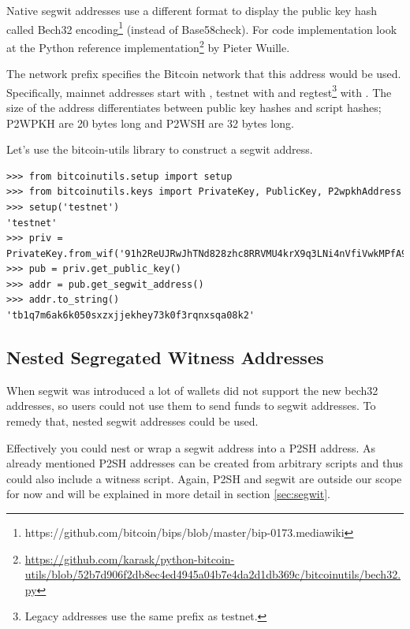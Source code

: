 Native segwit addresses use a different format to display the public key hash called Bech32 encoding\footnote{https://github.com/bitcoin/bips/blob/master/bip-0173.mediawiki} (instead of Base58check). For code implementation look at the Python reference implementation\footnote{\url{https://github.com/karask/python-bitcoin-utils/blob/52b7d906f2db8ec4ed4945a04b7e4da2d1db369c/bitcoinutils/bech32.py}} by Pieter Wuille.

The network prefix specifies the Bitcoin network that this address would be used. Specifically, mainnet addresses start with , testnet with  and regtest\footnote{Legacy addresses use the same prefix as testnet.} with . The size of the address differentiates between public key hashes and script hashes; P2WPKH are 20 bytes long and P2WSH are 32 bytes long.

Let's use the bitcoin-utils library to construct a segwit address.

\vspace{1em}
\begin{lstlisting}[style=Python,label={lst:display-segwit-address},caption={Example of displaying a segwit address from a public key using Python},captionpos=b]
>>> from bitcoinutils.setup import setup
>>> from bitcoinutils.keys import PrivateKey, PublicKey, P2wpkhAddress
>>> setup('testnet')
'testnet' 
>>> priv = PrivateKey.from_wif('91h2ReUJRwJhTNd828zhc8RRVMU4krX9q3LNi4nVfiVwkMPfA9p')
>>> pub = priv.get_public_key()  
>>> addr = pub.get_segwit_address()
>>> addr.to_string() 
'tb1q7m6ak6k050sxzxjjekhey73k0f3rqnxsqa08k2'
\end{lstlisting}
\vspace{1em}



\subsection*{Nested Segregated Witness Addresses}

When segwit was introduced a lot of wallets did not support the new bech32 addresses, so users could not use them to send funds to segwit addresses. To remedy that, nested segwit addresses could be used.

Effectively you could nest or wrap a segwit address into a P2SH address. As already mentioned P2SH addresses can be created from arbitrary scripts and thus could also include a witness script. Again, P2SH and segwit are outside our scope for now and will be explained in more detail in section \ref{sec:segwit}.

